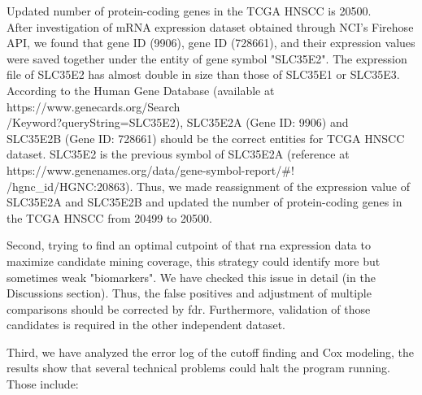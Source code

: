 \documentclass[preprint,12pt]{elsarticle}
\newenvironment{MyIndent}
{\par\leftskip1cm\relax\rightskip1cm\relax}
{\par\leftskip0cm\relax\rightskip0cm\relax}
\newenvironment{MyColorPar}[1]{%
    \leavevmode\color{#1}\ignorespaces%
}{%
}%
\begin{document}
\begin{MyColorPar}{blue}
\begin{MyIndent}
\begin{MyColorPar}{red}
\begin{outline}
\1 Updated number of protein-coding genes in the TCGA HNSCC is 20500.\\
After investigation of mRNA expression dataset obtained through NCI's Firehose API, we found that gene ID (9906), gene ID (728661), and their expression values were saved together under the entity of gene symbol "SLC35E2".
The expression file of SLC35E2 has almost double in size than those of SLC35E1 or SLC35E3.
According to the Human Gene Database (available at https://www.genecards.org/Search\\/Keyword?queryString=SLC35E2), SLC35E2A (Gene ID: 9906) and\\ SLC35E2B (Gene ID: 728661) should be the correct entities for TCGA HNSCC dataset.
SLC35E2 is the previous symbol of SLC35E2A (reference at https://www.genenames.org/data/gene-symbol-report/\#!\\/hgnc\_id/HGNC:20863).
Thus, we made reassignment of the expression value of SLC35E2A and SLC35E2B and updated the number of protein-coding genes in the TCGA HNSCC from 20499 to 20500.
\end{outline}


Second, trying to find an optimal cutpoint of that \acrshort{rna} expression data to maximize candidate mining coverage, this strategy could identify more but sometimes weak "biomarkers".
We have checked this issue in detail (in the Discussions section).
Thus, the false positives and adjustment of multiple comparisons should be corrected by \acrfull{fdr}.
Furthermore, validation of those candidates is required in the other independent dataset.

Third, we have analyzed the error log of the cutoff finding and Cox modeling, 
the results show that several technical problems could halt the program running.
Those include:
\begin{outline}


\end{outline}
\end{MyColorPar}
\end{MyIndent}
\end{MyColorPar}
\end{document}
